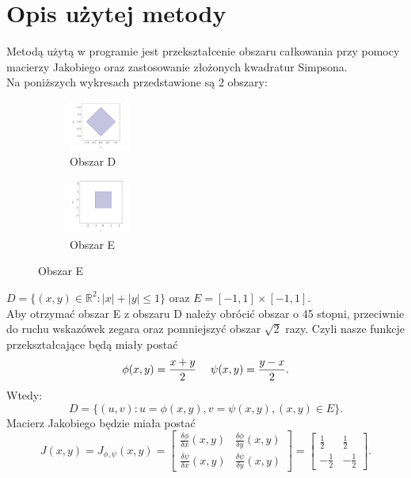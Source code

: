 \documentclass[12pt]{article}
\begin{document}
\section{Opis u\.zytej metody}
Metodą u\.zytą w programie jest przekszta\l cenie obszaru ca\l kowania przy pomocy
macierzy Jakobiego oraz zastosowanie z\l o\.zonych kwadratur Simpsona.\\
Na poni\.zszych wykresach przedstawione są 2 obszary: \\
\begin{figure}[h]
	\centering
	\begin{subfigure}[h]{0.49\linewidth}
		\centering
		\begin{adjustbox}{width=\linewidth}
            \includegraphics[width=2cm]{wolf_romb.png}
		\end{adjustbox}
            \caption{Obszar D}
	\end{subfigure}
	\hfill
	\begin{subfigure}[h]{0.49\linewidth}
		\centering
		\begin{adjustbox}{width=0.9\linewidth}
            \includegraphics[width=2cm]{wolf_kwad.png}
		\end{adjustbox}
            \caption{Obszar E}
	\end{subfigure}
\end{figure}
$D = \{(x,y) \in \mathbb R^2 : |x| + |y| \leq 1 \}$ oraz $E = [-1,1] \times [-1,1]$.\\
Aby otrzyma\'c obszar E z obszaru D nale\.zy obr\'oci\'c obszar o 45 stopni,
przeciwnie do ruchu wskaz\'owek zegara oraz pomniejszy\'c obszar $\sqrt{2}$ razy.
Czyli nasze funkcje przekszta\l cające będą mia\l y posta\'c
\begin{equation}
    \phi(x,y) = \frac{x+y}{2} \hskip3ex
    \psi(x,y) = \frac{y-x}{2}.
\end{equation}
Wtedy:
\begin{equation}
    D = \{ (u,v): u=\phi(x,y), v=\psi(x,y), (x,y)\in E \}.
\end{equation}
Macierz Jakobiego będzie mia\l a posta\'c
\begin{equation}
    J(x,y) = J_{\phi ,\psi}(x,y) = 
    \left[ \begin{array}{cc}
        \frac{\delta \phi}{\delta x}(x,y) & \frac{\delta \phi}{\delta y}(x,y) \\
        \frac{\delta \psi}{\delta x}(x,y) & \frac{\delta \psi}{\delta y}(x,y) 
    \end{array}\right] =
    \left[ \begin{array}{cc}
        \frac{1}{2} & \frac{1}{2} \\
        -\frac{1}{2} & -\frac{1}{2} 
    \end{array}\right] .
\end{equation}
\end{document}
